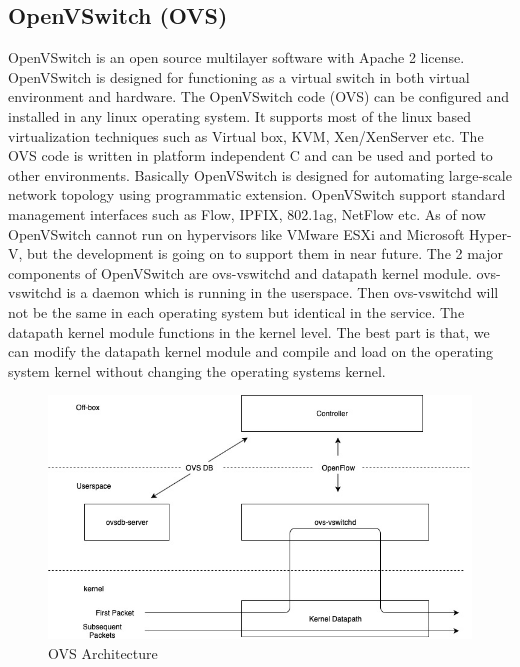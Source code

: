 \subsection{OpenVSwitch (OVS)} 


OpenVSwitch\cite{openvswitch}\cite{OVS} is an open source multilayer software with Apache 2 license. OpenVSwitch is designed for functioning as a virtual switch in both virtual environment and hardware. The OpenVSwitch code (OVS) can be configured and installed in any linux operating system. It supports most of the linux based virtualization techniques such as Virtual box, KVM, Xen/XenServer etc. The OVS code is written in platform independent C and can be used and ported to other environments. Basically OpenVSwitch is designed for automating large-scale network topology using programmatic extension. OpenVSwitch support standard management interfaces such as Flow, IPFIX, 802.1ag, NetFlow etc. As of now OpenVSwitch cannot run on hypervisors like VMware ESXi and Microsoft Hyper-V, but the development is going on to support them in near future. The 2 major components of OpenVSwitch are  ovs-vswitchd and datapath kernel module. ovs-vswitchd is a daemon which is running in the userspace. Then ovs-vswitchd will not be the same in each operating system but identical in the service. The datapath kernel module functions in the kernel level. The best part is that, we can modify the datapath kernel module and compile and load on the operating system kernel without changing the operating systems kernel. \\

\begin{figure}
       \centering\includegraphics[width=\textwidth]{Final/OVS Architecture-2.jpg}
       \caption{OVS Architecture}
       \label{fig:compbest}
\end{figure}

